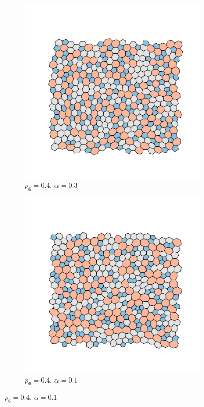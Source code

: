 \begin{figure}[bt]
     \centering
     
     \begin{subfigure}[b]{0.45\textwidth}
         \centering
         \includegraphics[width=\textwidth]{./figures/targeted_opt/topt_30.pdf}
         \caption{$p_6=0.4$, $\alpha=0.3$}
         \label{fig:toptconfigs1}
     \end{subfigure}
     \hfill
     \begin{subfigure}[b]{0.45\textwidth}
         \centering
         \includegraphics[width=\textwidth]{./figures/targeted_opt/topt_10.pdf}
         \caption{$p_6=0.4$, $\alpha=0.1$}
         \label{fig:toptconfigs2}
     \end{subfigure}
     

\end{figure}
